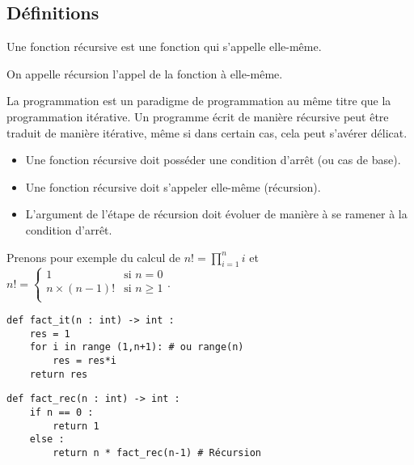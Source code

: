 

\subsection*{Définitions}
\begin{defi}%
Une fonction récursive est une fonction qui s'appelle elle-même.

On appelle récursion l'appel de la fonction à elle-même.
\end{defi}

La programmation est un paradigme de programmation au même titre que la programmation itérative. Un programme écrit de manière récursive peut être traduit de manière itérative, même si dans certain cas, cela peut s'avérer délicat.


\begin{methode}
\begin{itemize}
\item Une fonction récursive doit posséder une condition d'arrêt (ou cas de base).
\item Une fonction récursive doit s'appeler elle-même (récursion).
\item L'argument de l'étape de récursion doit évoluer de manière à se ramener à la condition d'arrêt.
\end{itemize}
\end{methode}
 
 
\begin{exemple} 
Prenons pour exemple du calcul de $n! = \prod\limits_{i=1}^{n} i$ et 
$n! = 
\left\{
\begin{array}{ll} 
1                        & \text{si } n=0 \\
n\times(n-1)! & \text{si } n\geq 1 \\
\end{array}
\right.
$.
  
\noindent\begin{minipage}[c]{.45\linewidth}
\begin{lstlisting}
def fact_it(n : int) -> int :
    res = 1
    for i in range (1,n+1): # ou range(n)
        res = res*i
    return res
\end{lstlisting}
\end{minipage} \hfill
\begin{minipage}[c]{.45\linewidth}
\begin{lstlisting}
def fact_rec(n : int) -> int :
    if n == 0 : 
        return 1
    else : 
        return n * fact_rec(n-1) # Récursion
\end{lstlisting}
\end{minipage} 
\end{exemple}

